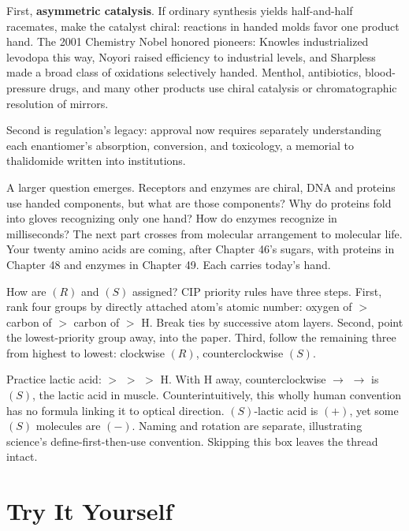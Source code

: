 First, \textbf{asymmetric catalysis}. If ordinary synthesis yields half-and-half racemates, make the catalyst chiral: reactions in handed molds favor one product hand. The 2001 Chemistry Nobel honored pioneers: Knowles industrialized levodopa this way, Noyori raised efficiency to industrial levels, and Sharpless made a broad class of oxidations selectively handed. Menthol, antibiotics, blood-pressure drugs, and many other products use chiral catalysis or chromatographic resolution of mirrors.

Second is regulation's legacy: approval now requires separately understanding each enantiomer's absorption, conversion, and toxicology, a memorial to thalidomide written into institutions.

A larger question emerges. Receptors and enzymes are chiral, DNA and proteins use handed components, but what are those components? Why do proteins fold into gloves recognizing only one hand? How do enzymes recognize in milliseconds? The next part crosses from molecular arrangement to molecular life. Your twenty amino acids are coming, after Chapter 46's sugars, with proteins in Chapter 48 and enzymes in Chapter 49. Each carries today's hand.

\begin{tiaozhan}
How are $(R)$ and $(S)$ assigned? CIP priority rules have three steps. First, rank four groups by directly attached atom's atomic number: oxygen of  $>$ carbon of  $>$ carbon of  $>$ H. Break ties by successive atom layers. Second, point the lowest-priority group away, into the paper. Third, follow the remaining three from highest to lowest: clockwise $(R)$, counterclockwise $(S)$.

Practice lactic acid:  $>$  $>$  $>$ H. With H away, counterclockwise  $\rightarrow$  $\rightarrow$  is $(S)$, the lactic acid in muscle. Counterintuitively, this wholly human convention has no formula linking it to optical direction. $(S)$-lactic acid is $(+)$, yet some $(S)$ molecules are $(-)$. Naming and rotation are separate, illustrating science's define-first-then-use convention. Skipping this box leaves the thread intact.
\end{tiaozhan}

\section*{Try It Yourself}

